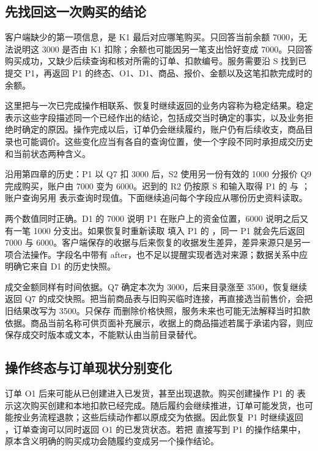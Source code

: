 \subsection*{先找回这一次购买的结论}

客户端缺少的第一项信息，是 K1 最后对应哪笔购买。只回答当前余额 7000，无法说明这 3000 是否由 K1 扣除；余额也可能因另一笔支出恰好变成 7000。只回答购买成功，又缺少后续查询和核对所需的订单、扣款编号。服务需要沿 S 找到已提交 P1，再返回 P1 的终态、O1、D1、商品、报价、金额以及这笔扣款完成时的余额。

这里把与一次已完成操作相联系、恢复时继续返回的业务内容称为稳定结果。稳定表示这些字段描述同一个已经作出的结论，包括成交当时确定的事实，以及业务拒绝时确定的原因。操作完成以后，订单仍会继续履约，账户仍有后续收支，商品目录也可能调价。这些变化应当有各自的查询位置，使一个字段不同时承担成交历史和当前状态两种含义。

沿用第四章的历史：P1 以 Q7 扣 3000 后，S2 使用另一份有效的 1000 分报价 Q9 完成购买，账户由 7000 变为 6000。迟到的 R2 仍按原 S 和输入取得 P1 的  与 ；账户查询另用  表示查询时现值。下面继续追问每个字段应从哪份历史资料读取。



两个数值同时正确。D1 的 7000 说明 P1 在账户上的资金位置，6000 说明之后又有一笔 1000 分支出。如果恢复时重新读取  填入 P1 的 ，同一 P1 就会先后返回 7000 与 6000。客户端保存的收据与后来恢复的收据发生差异，差异来源只是另一项合法操作。字段名中带有 after，也不足以提醒实现者选对来源；数据关系中应明确它来自 D1 的历史快照。

成交金额同样有时间依据。Q7 确定本次为 3000，后来目录涨至 3500，恢复继续返回 Q7 的成交快照。把当前商品表与旧购买临时连接，再直接选当前售价，会把旧结果改写为 3500。只保存  而删除价格快照，服务未来也可能无法解释当时扣款依据。商品当前名称可供页面补充展示，收据上的商品描述若属于承诺内容，则应保存成交时版本或文本，不能默认由当前目录替代。

\subsection*{操作终态与订单现状分别变化}

订单 O1 后来可能从已创建进入已发货，甚至出现退款。购买创建操作 P1 的  表示这次购买创建和本地扣款已经完成。随后履约会继续推进，订单可能发货，也可能按业务流程退款；这些后续动作都以原成交为依据。因此恢复 P1 时继续返回 ，订单查询可以同时返回 O1 的已发货状态。若把  直接写到 P1 的操作结果中，原本含义明确的购买成功会随履约变成另一个操作结论。

